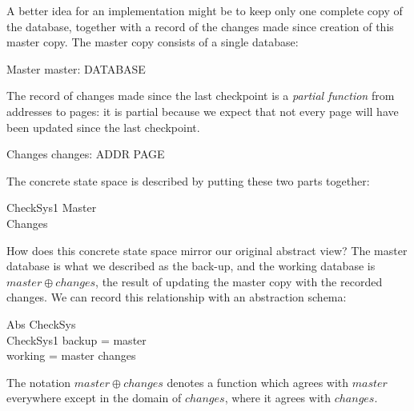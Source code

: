 A better idea for an implementation might be to keep only one complete
copy of the database, together with a record of
the changes made since creation of this master copy.
The master copy consists of a single database:
\begin{schema}{Master}
	master: DATABASE
\end{schema}
The record of changes made since the last checkpoint is a
{\em partial function} from addresses to pages: it is partial because
we expect that not every page will have been updated since the last
checkpoint.
\begin{schema}{Changes}
	changes: ADDR \pfun PAGE
\end{schema}
The concrete state space is described by putting these two parts together:
\begin{schema}{CheckSys1}
	Master \\
	Changes
\end{schema}
How does this concrete state space mirror our original abstract view?
The master database is what we described as the back-up, and
the working database is $master \oplus changes$, the result
of updating the master copy with the recorded changes. We can record
this relationship with an abstraction schema:
\begin{schema}{Abs}
	CheckSys \\
	CheckSys1
\where  
	backup = master \\
	working = master \oplus changes
\end{schema}
The notation $master \oplus changes$ denotes a function which agrees
with $master$ everywhere except in the domain of $changes$, where it
agrees with $changes$.

